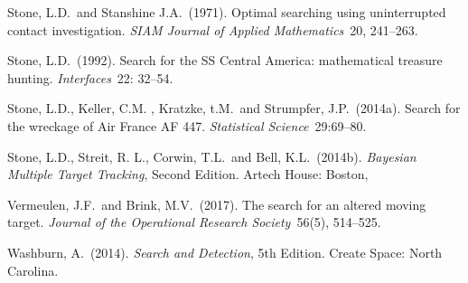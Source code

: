 \documentclass[12pt]{article}
\theoremstyle{plain}
\theoremstyle{definition}
\theoremstyle{remark}
\begin{document}
\begin{description}
\item{} Stone, L.D.~and Stanshine J.A.~(1971). Optimal searching using uninterrupted contact investigation.  \emph{SIAM Journal of Applied Mathematics}~20, 241--263.

\item{} Stone, L.D.~(1992). Search for the SS Central America: mathematical treasure hunting. \emph{Interfaces}~22: 32--54. 

\item{} Stone, L.D., Keller, C.M. , Kratzke, t.M.~and Strumpfer, J.P.~(2014a). Search for the wreckage of Air France AF 447. \emph{Statistical Science}~29:69--80. 

\item{} Stone, L.D.,  Streit, R. L.,  Corwin, T.L.~and Bell, K.L.~(2014b). \emph{Bayesian Multiple Target Tracking}, Second Edition. 
Artech House: Boston,


\item{} Vermeulen, J.F.~and Brink, M.V.~(2017).   The search for an altered moving target.  \emph{Journal of the Operational Research Society}~56(5), 514--525.

\item{} Washburn, A.~(2014). \emph{Search and Detection}, 5th Edition. Create Space: North Carolina.

\end{description}
\end{document}
